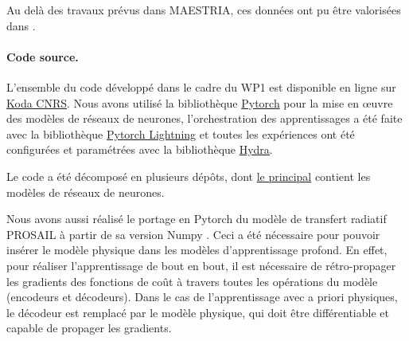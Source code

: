 Au delà des travaux prévus dans MAESTRIA, ces données ont pu être valorisées dans \citep{dumeur-2023-self-satel}.

\paragraph{Code source.}
L’ensemble du code développé dans le cadre du WP1 est disponible en ligne sur \href{https://src.koda.cnrs.fr/mmdc}{Koda CNRS}. Nous avons utilisé la bibliothèque \href{https://pytorch.org/}{Pytorch} pour la mise en œuvre des modèles de réseaux de neurones, l’orchestration des apprentissages a été faite avec la bibliothèque \href{https://lightning.ai/}{Pytorch Lightning} et toutes les expériences ont été configurées et paramétrées avec la bibliothèque \href{https://hydra.cc/}{Hydra}.

Le code a été décomposé en plusieurs dépôts, dont \href{https://src.koda.cnrs.fr/mmdc/mmdc-singledate}{le principal} contient les modèles de réseaux de neurones.

Nous avons aussi réalisé le portage en Pytorch du modèle de transfert radiatif PROSAIL \cite{jacquemoud-2009-prosp-sail-model} à partir de sa version Numpy \cite{domenzain19}. Ceci a été nécessaire pour pouvoir insérer le modèle physique dans les modèles d’apprentissage profond. En effet, pour réaliser l’apprentissage de bout en bout, il est nécessaire de rétro-propager les gradients des fonctions de coût à travers toutes les opérations du modèle (encodeurs et décodeurs). Dans le cas de l’apprentissage avec a priori physiques, le décodeur est remplacé par le modèle physique, qui doit être différentiable et capable de propager les gradients.


